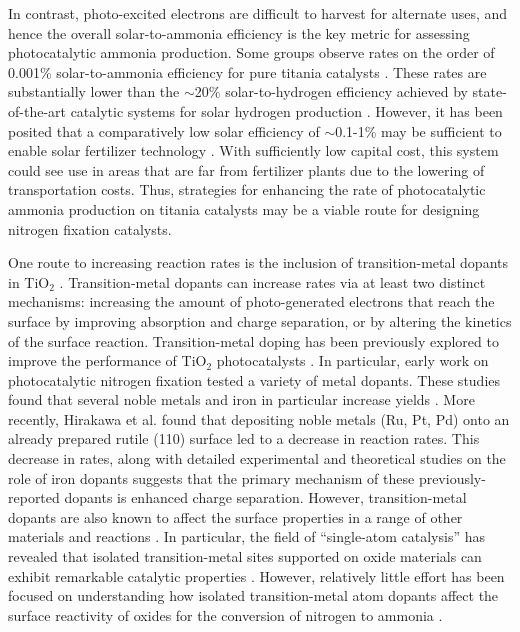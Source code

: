 In contrast, photo-excited electrons are difficult to harvest for alternate uses, and hence the overall solar-to-ammonia efficiency is the key metric for assessing photocatalytic ammonia production. Some groups observe rates on the order of 0.001\% solar-to-ammonia efficiency for pure titania catalysts \cite{Hirakawa_2017}. These rates are substantially lower than the $\sim$20\% solar-to-hydrogen efficiency achieved by state-of-the-art catalytic systems for solar hydrogen production \cite{Nakamura_2015, Jia_2016}. However, it has been posited that a comparatively low solar efficiency of $\sim$0.1-1\% may be sufficient to enable solar fertilizer technology \cite{Comer_2019, Medford_2017}. With sufficiently low capital cost, this system could see use in areas that are far from fertilizer plants due to the lowering of transportation costs. Thus, strategies for enhancing the rate of photocatalytic ammonia production on titania catalysts may be a viable route for designing nitrogen fixation catalysts.

One route to increasing reaction rates is the inclusion of transition\hyp{}metal dopants in TiO$_2$ \cite{Zaleska_2008}.  Transition\hyp{}metal dopants can increase rates via at least two distinct mechanisms: increasing the amount of photo-generated electrons that reach the surface by improving absorption and charge separation, or by altering the kinetics of the surface reaction.
Transition-metal doping has been previously explored to improve the performance of TiO$_2$ photocatalysts \cite{Schneider_2014, Li_2007, Dozzi_2013}. In particular, early work on photocatalytic nitrogen fixation tested a variety of metal dopants. These studies found that several noble metals \cite{Ranjit_1996} and iron in particular increase yields \cite{Schrauzer_1977, Schrauzer_1983, Augugliaro_1982, Soria_1991, Ranjit_1996, Ranjit_1997}. More recently, Hirakawa et al. found that depositing noble metals (Ru, Pt, Pd) onto an already prepared rutile (110) surface led to a decrease in reaction rates.\cite{Hirakawa_2017} This decrease in rates, along with detailed experimental and theoretical studies on the role of iron dopants  \cite{Soria_1991, Comer_2018} suggests that the primary mechanism of these previously-reported dopants is enhanced charge separation. However, transition-metal dopants are also known to affect the surface properties in a range of other materials and reactions \cite{Khan_2018, Gu_2014, Ammal_2016, Gu_2017, Comer_2018, Garc_a_Mota_2011, Yao_2017}. In particular, the field of ``single-atom catalysis'' has revealed that isolated transition-metal sites supported on oxide materials can exhibit remarkable catalytic properties \cite{Liu_2016, Qiao_2011, O_Connor_2018}. However, relatively little effort has been focused on understanding how isolated transition-metal atom dopants affect the surface reactivity of oxides for the conversion of nitrogen to ammonia \cite{Tao_2019, Liu_2019, Zhao_2019, Cheng_2019, Li_2017}.

